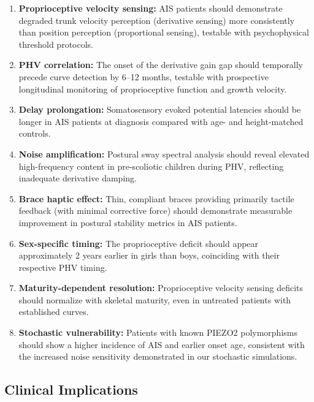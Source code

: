 \documentclass[12pt,a4paper]{article}
\begin{document}
\begin{enumerate}
\item \textbf{Proprioceptive velocity sensing:} AIS patients should demonstrate degraded trunk velocity perception (derivative sensing) more consistently than position perception (proportional sensing), testable with psychophysical threshold protocols.

\item \textbf{PHV correlation:} The onset of the derivative gain gap should temporally precede curve detection by 6--12 months, testable with prospective longitudinal monitoring of proprioceptive function and growth velocity.

\item \textbf{Delay prolongation:} Somatosensory evoked potential latencies should be longer in AIS patients at diagnosis compared with age- and height-matched controls.

\item \textbf{Noise amplification:} Postural sway spectral analysis should reveal elevated high-frequency content in pre-scoliotic children during PHV, reflecting inadequate derivative damping.

\item \textbf{Brace haptic effect:} Thin, compliant braces providing primarily tactile feedback (with minimal corrective force) should demonstrate measurable improvement in postural stability metrics in AIS patients.

\item \textbf{Sex-specific timing:} The proprioceptive deficit should appear approximately 2 years earlier in girls than boys, coinciding with their respective PHV timing.

\item \textbf{Maturity-dependent resolution:} Proprioceptive velocity sensing deficits should normalize with skeletal maturity, even in untreated patients with established curves.

\item \textbf{Stochastic vulnerability:} Patients with known PIEZO2 polymorphisms should show a higher incidence of AIS and earlier onset age, consistent with the increased noise sensitivity demonstrated in our stochastic simulations.
\end{enumerate}

\subsection{Clinical Implications}
\end{document}
